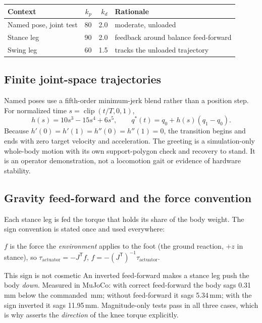 \documentclass[11pt,a4paper]{article}
\begin{document}
\begin{center}\small
\begin{tabular}{@{}lrrl@{}}
\toprule
\textbf{Context} & $k_p$ & $k_d$ & \textbf{Rationale} \\
\midrule
Named pose, joint test & 80  & 2.0 & moderate, unloaded \\
Stance leg             & 90  & 2.0 & feedback around balance feed-forward \\
Swing leg              & 60  & 1.5 & tracks the unloaded trajectory \\
\bottomrule
\end{tabular}
\end{center}

\subsection{Finite joint-space trajectories}

Named poses use a fifth-order minimum-jerk blend rather than a position step.
For normalized time $s=\operatorname{clip}(t/T,0,1)$,
\[
  h(s)=10s^3-15s^4+6s^5,\qquad
  q^*(t)=q_0+h(s)(q_1-q_0).
\]
Because $h'(0)=h'(1)=h''(0)=h''(1)=0$, the transition begins and ends with
zero target velocity and acceleration. The greeting is a simulation-only
whole-body motion with its own support-polygon check and recovery to stand. It
is an operator demonstration, not a locomotion gait or evidence of hardware
stability.

\subsection{Gravity feed-forward and the force convention}

Each stance leg is fed the torque that holds its share of the body weight. The
sign convention is stated once and used everywhere:

\begin{center}
$f$ is the force the \emph{environment} applies to the foot (the ground
reaction, $+z$ in stance), so \quad
$\tau_{\mathrm{actuator}} = -J^{\mathsf{T}} f$, \quad
$f = -(J^{\mathsf{T}})^{-1}\tau_{\mathrm{actuator}}$.
\end{center}

\begin{caveat}{This sign is not cosmetic}
An inverted feed-forward makes a stance leg push the body \emph{down}. Measured
in MuJoCo: with correct feed-forward the body sags 0.31\,mm below the commanded
\RdStandHeight\,mm; without feed-forward it sags 5.34\,mm; with the sign
inverted it sags 11.95\,mm. Magnitude-only tests pass in all three cases, which
is why  asserts the \emph{direction} of the knee
torque explicitly.
\end{caveat}
\end{document}
